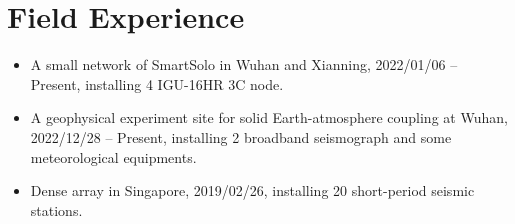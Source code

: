 \section{Field Experience}
\begin{itemize}
\item A small network of SmartSolo in Wuhan and Xianning,
      2022/01/06 -- Present, installing 4 IGU-16HR 3C node.
\item A geophysical experiment site for solid Earth-atmosphere coupling at Wuhan,
      2022/12/28 -- Present, installing 2 broadband seismograph and some meteorological equipments.
\item Dense array in Singapore,
      2019/02/26, installing 20 short-period seismic stations.
\end{itemize}
